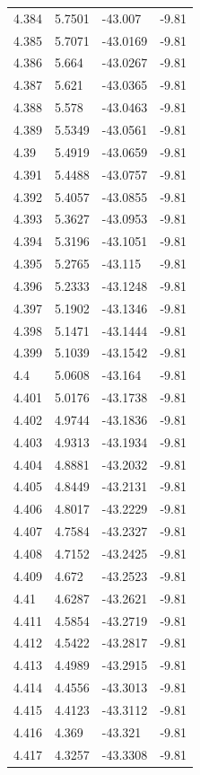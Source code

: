 \begin{tabular}{llll}
4.384 & 5.7501 & -43.007 & -9.81 \\
4.385 & 5.7071 & -43.0169 & -9.81 \\
4.386 & 5.664 & -43.0267 & -9.81 \\
4.387 & 5.621 & -43.0365 & -9.81 \\
4.388 & 5.578 & -43.0463 & -9.81 \\
4.389 & 5.5349 & -43.0561 & -9.81 \\
4.39 & 5.4919 & -43.0659 & -9.81 \\
4.391 & 5.4488 & -43.0757 & -9.81 \\
4.392 & 5.4057 & -43.0855 & -9.81 \\
4.393 & 5.3627 & -43.0953 & -9.81 \\
4.394 & 5.3196 & -43.1051 & -9.81 \\
4.395 & 5.2765 & -43.115 & -9.81 \\
4.396 & 5.2333 & -43.1248 & -9.81 \\
4.397 & 5.1902 & -43.1346 & -9.81 \\
4.398 & 5.1471 & -43.1444 & -9.81 \\
4.399 & 5.1039 & -43.1542 & -9.81 \\
4.4 & 5.0608 & -43.164 & -9.81 \\
4.401 & 5.0176 & -43.1738 & -9.81 \\
4.402 & 4.9744 & -43.1836 & -9.81 \\
4.403 & 4.9313 & -43.1934 & -9.81 \\
4.404 & 4.8881 & -43.2032 & -9.81 \\
4.405 & 4.8449 & -43.2131 & -9.81 \\
4.406 & 4.8017 & -43.2229 & -9.81 \\
4.407 & 4.7584 & -43.2327 & -9.81 \\
4.408 & 4.7152 & -43.2425 & -9.81 \\
4.409 & 4.672 & -43.2523 & -9.81 \\
4.41 & 4.6287 & -43.2621 & -9.81 \\
4.411 & 4.5854 & -43.2719 & -9.81 \\
4.412 & 4.5422 & -43.2817 & -9.81 \\
4.413 & 4.4989 & -43.2915 & -9.81 \\
4.414 & 4.4556 & -43.3013 & -9.81 \\
4.415 & 4.4123 & -43.3112 & -9.81 \\
4.416 & 4.369 & -43.321 & -9.81 \\
4.417 & 4.3257 & -43.3308 & -9.81 \\

\end{tabular}
